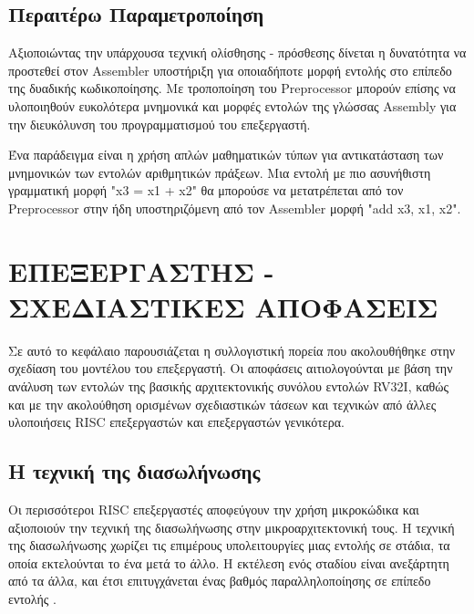 \documentclass[11pt]{extarticle}
\let\stdsection\section
\renewcommand\section{\newpage\stdsection}
\begin{document}
\subsection{Περαιτέρω Παραμετροποίηση}
Αξιοποιώντας την υπάρχουσα τεχνική ολίσθησης - πρόσθεσης δίνεται η δυνατότητα να προστεθεί στον Assembler υποστήριξη για οποιαδήποτε μορφή εντολής στο επίπεδο της δυαδικής κωδικοποίησης.
Με τροποποίηση του Preprocessor μπορούν επίσης να υλοποιηθούν ευκολότερα μνημονικά και μορφές εντολών της γλώσσας Assembly για την διευκόλυνση του προγραμματισμού του επεξεργαστή. 

Ένα παράδειγμα είναι η χρήση απλών μαθηματικών τύπων για αντικατάσταση των μνημονικών των εντολών αριθμητικών πράξεων.
Μια εντολή με πιο ασυνήθιστη γραμματική μορφή "x3 = x1 + x2" θα μπορούσε να μετατρέπεται από τον Preprocessor στην ήδη υποστηριζόμενη από τον Assembler μορφή "add x3, x1, x2".

\section{ΕΠΕΞΕΡΓΑΣΤΗΣ - ΣΧΕΔΙΑΣΤΙΚΕΣ ΑΠΟΦΑΣΕΙΣ}
Σε αυτό το κεφάλαιο παρουσιάζεται η συλλογιστική πορεία που ακολουθήθηκε στην σχεδίαση του μοντέλου του επεξεργαστή.
Οι αποφάσεις αιτιολογούνται με βάση την ανάλυση των εντολών της βασικής αρχιτεκτονικής συνόλου εντολών RV32I, καθώς και με την ακολούθηση ορισμένων σχεδιαστικών τάσεων και τεχνικών από άλλες υλοποιήσεις RISC επεξεργαστών και επεξεργαστών γενικότερα.

\subsection{Η τεχνική της διασωλήνωσης}
Οι περισσότεροι RISC επεξεργαστές αποφεύγουν την χρήση μικροκώδικα και αξιοποιούν την τεχνική της διασωλήνωσης στην μικροαρχιτεκτονική τους.
Η τεχνική της διασωλήνωσης χωρίζει τις επιμέρους υπολειτουργίες μιας εντολής σε στάδια, τα οποία εκτελούνται το ένα μετά το άλλο.
Η εκτέλεση ενός σταδίου είναι ανεξάρτητη από τα άλλα, και έτσι επιτυγχάνεται ένας βαθμός παραλληλοποίησης σε επίπεδο εντολής \cite{patterson}. \newline
\end{document}
